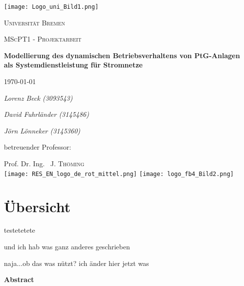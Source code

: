\documentclass[onecolumn,10pt,titlepage]{article}
\begin{document}
\begin{titlepage}
	\centering
	
	{\texttt{[image: Logo\_uni\_Bild1.png]}\par}
	\vspace{1cm}
	{\scshape\Large Universität Bremen \par}
	\vspace{1cm}
	{\scshape\LARGE MScPT1 - Projektarbeit \par}
	\vspace{1.5cm}
	{\huge\bfseries Modellierung des dynamischen Betriebsverhaltens von PtG-Anlagen als Systemdienstleistung für Stromnetze\par}
	\vspace{2cm}
    {\large \today\par}
    \vspace{2cm}
	{\Large\itshape Lorenz Beck (3093543)\par}
    \vspace{0.3cm}
    {\Large\itshape David Fuhrländer (3145486)\par}
    \vspace{0.3cm}
    {\Large\itshape Jörn Lönneker (3145360)\par}
	\vfill
	betreuender Professor:\par
	Prof. Dr. Ing. ~J. \textsc{Thöming}\\

    \vfill
   	\texttt{[image: RES\_EN\_logo\_de\_rot\_mittel.png]}
	\hfill	
	\texttt{[image: logo\_fb4\_Bild2.png]}%

	
\end{titlepage}

\onehalfspace

\section*{Übersicht}
testetetete

und ich hab was ganz anderes geschrieben

naja...ob das was nützt?
ich änder hier jetzt was

{\textbf{Abstract}}\par
\end{document}
